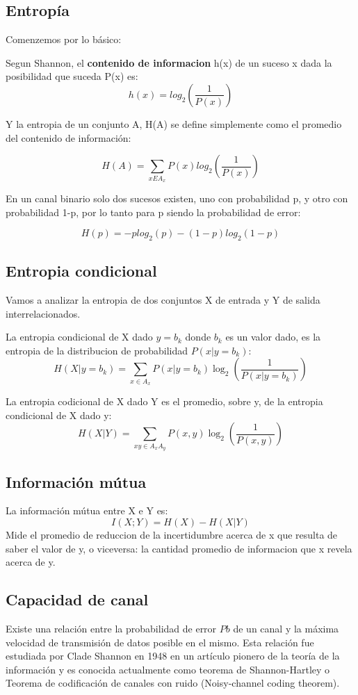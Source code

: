 \subsection{Entropía}

Comenzemos por lo básico:

Segun Shannon, el \textbf{contenido de informacion} h(x) de un suceso x dada la posibilidad que suceda P(x) es:
$$ h(x) = log_{2}\left(\frac{1}{P(x)}\right) $$

Y la entropia de un conjunto A, H(A) se define simplemente como el promedio del contenido de información:

$$ H(A) = \sum_{x E A_{x}} P(x)log_{2}\left(\frac{1}{P(x)}\right)$$

En un canal binario solo dos sucesos existen, uno con probabilidad p, y otro con probabilidad 1-p, por lo tanto para p siendo la probabilidad de error:

$$ H(p) = -p log_{2}(p)-(1-p)log_{2}(1-p) $$

\subsection{Entropia condicional}

Vamos a analizar la entropia de dos conjuntos X de entrada y Y de salida interrelacionados.

La entropia condicional de X dado $y=b_k$ donde $b_k$ es un valor dado, es la entropia de la distribucion de probabilidad $P(x|y=b_{k})$:
$$H(X|y=b_{k}) = \sum_{x \in A_{x}} P(x | y=b_{k})\log_2\left(\frac{1}{P(x | y=b_{k})}\right) $$

La entropia codicional de X dado Y es el promedio, sobre y, de la entropia condicional de X dado y:
$$H(X|Y) =  \sum_{xy \in A_{x}A_{y}} P(x,y)\log_2\left(\frac{1}{P(x,y)}\right) $$

\subsection{Información mútua}
La información mútua entre X e Y es:
$$I(X;Y) = H(X)-H(X|Y)$$
Mide el promedio de reduccion de la incertidumbre acerca de x que resulta de saber el valor de y, o viceversa: la cantidad promedio de informacion que x revela acerca de y.

\fi
\subsection{Capacidad de canal}

Existe una relación entre la probabilidad de error $Pb$ de un canal y la máxima velocidad de transmisión de datos posible en el mismo.
Esta relación fue estudiada por Clade Shannon en 1948 en un artículo pionero de la teoría de la información \cite{shannon48} y es conocida actualmente como teorema de Shannon-Hartley o Teorema de codificación de canales con ruido (Noisy-channel coding theorem).


